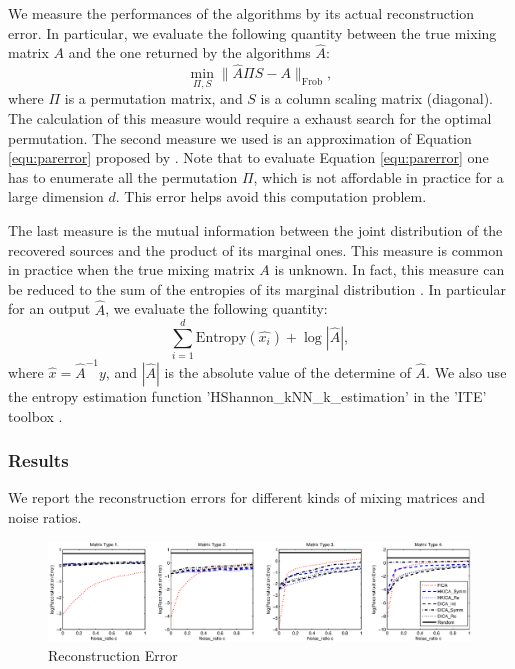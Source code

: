 \documentclass[twoside]{article}
\theoremstyle{definition}
\begin{document}
We measure the performances of the algorithms by its actual reconstruction error.
In particular, we evaluate the following quantity between the true mixing matrix $A$ and the one returned by the algorithms $\widehat{A}$:
\begin{equation}
\label{equ:parerror}
\min_{\Pi,S} \|\widehat{A}\Pi S - A\|_{\text{Frob}},
\end{equation}
where $\Pi$ is a permutation matrix, and $S$ is a column scaling matrix (diagonal).
The calculation of this measure would require a exhaust search for the optimal permutation.
The second measure we used is an approximation of Equation \eqref{equ:parerror} proposed by \citet{comon1994independent}. 
Note that to evaluate Equation \eqref{equ:parerror} one has to enumerate all the permutation $\Pi$, which is not affordable in practice for a large dimension $d$. 
This error helps avoid this computation problem. 

The last measure is the mutual information between the joint distribution of the recovered sources and the product of its marginal ones. 
This measure is common in practice when the true mixing matrix $A$ is unknown. 
In fact, this measure can be reduced to the sum of the entropies of its marginal distribution \citep{Learned-Miller:2003:IUS:945365.964306}. 
In particular for an output $\widehat{A}$, we evaluate the following quantity:
\begin{equation}
\sum_{i = 1}^{d} \text{Entropy}(\widehat{x_i}) + \log |\widehat{A}|,
\end{equation}
where $\widehat{x} = \widehat{A}^{-1}y$, and $|\widehat{A}|$ is the absolute value of the determine of $\widehat{A}$. We also use the entropy estimation function 'HShannon\_kNN\_k\_estimation' in the 'ITE' toolbox \citep{szabo14information}. 
\fi

\subsubsection{Results}
We report the reconstruction errors for different kinds of mixing matrices and noise ratios.

\begin{figure}[pt]
\label{fig:Error}
\centering
	\includegraphics[width = \linewidth]{error}
\caption{Reconstruction Error}
\end{figure}
\end{document}

